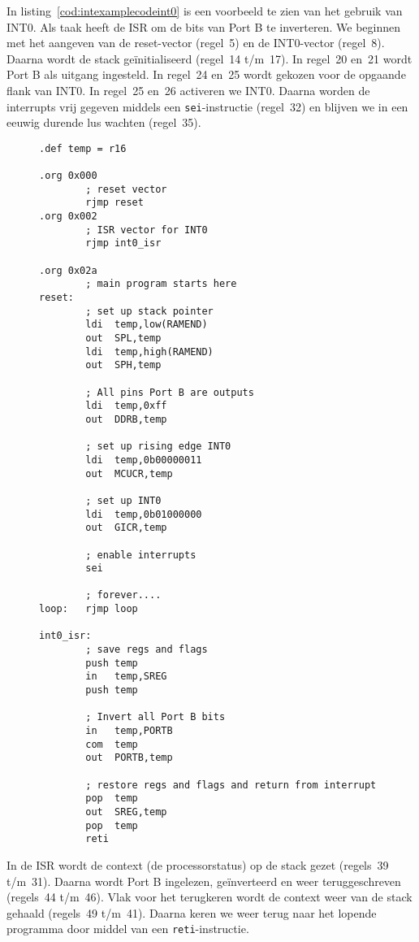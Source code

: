 In listing~\ref{cod:intexamplecodeint0} is een voorbeeld te zien van het
gebruik van INT0. Als taak heeft de ISR om de bits van Port B te
inverteren. We beginnen met het aangeven van de reset-vector (regel~5) en de
INT0-vector (regel~8). Daarna wordt de stack ge\"initialiseerd (regel~14
t/m~17). In regel~20 en~21 wordt Port B als uitgang ingesteld. In regel~24
en~25 wordt gekozen voor de opgaande flank van INT0. In regel~25 en~26
activeren we INT0. Daarna worden de interrupts vrij gegeven middels een
\lstinline|sei|-instructie (regel~32) en blijven we in een eeuwig durende lus
wachten (regel~35).

\begin{figure}[!p]
\begin{lstlisting}[language=AVRassembler,caption=Voorbeeldprogramma INT0 met opgaande flank en ISR.,label=cod:intexamplecodeint0]
.def temp = r16

.org 0x000
        ; reset vector
		rjmp reset
.org 0x002
        ; ISR vector for INT0
		rjmp int0_isr

.org 0x02a
        ; main program starts here
reset:
		; set up stack pointer
		ldi	 temp,low(RAMEND)
		out	 SPL,temp
		ldi	 temp,high(RAMEND)
		out	 SPH,temp
		
		; All pins Port B are outputs
		ldi  temp,0xff
		out  DDRB,temp

		; set up rising edge INT0
		ldi	 temp,0b00000011
		out	 MCUCR,temp

		; set up INT0
		ldi	 temp,0b01000000
		out	 GICR,temp

		; enable interrupts
		sei

		; forever....
loop: 	rjmp loop

int0_isr:
        ; save regs and flags
		push temp
		in   temp,SREG
		push temp

        ; Invert all Port B bits
        in   temp,PORTB
        com  temp
        out  PORTB,temp

		; restore regs and flags and return from interrupt
		pop	 temp
		out	 SREG,temp
		pop	 temp
 		reti
\end{lstlisting}
\end{figure}

In de ISR wordt de context (de processorstatus) op de stack gezet (regels~39
t/m~31). Daarna wordt Port B ingelezen, ge\"inverteerd en weer
teruggeschreven (regels~44 t/m~46). Vlak voor het terugkeren wordt de context
weer van de stack gehaald (regels~49 t/m~41). Daarna keren we weer terug naar
het lopende programma door middel van een \lstinline|reti|-instructie.

